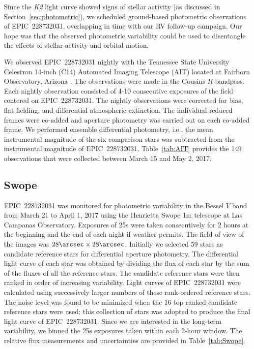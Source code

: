 \documentclass[twocolumn]{aastex61}
\begin{document}
Since the {\it K2} light curve showed signs of stellar activity (as discussed in Section~\ref{sec:photometric}), we scheduled ground-based photometric observations of EPIC~228732031, overlapping in time with our RV follow-up campaign. Our hope was that the observed photometric variability could be used to disentangle the effects of stellar activity and orbital motion.

We observed EPIC~228732031 nightly with the Tennessee State University Celestron 14-inch (C14) Automated Imaging Telescope (AIT) located at Fairborn Observatory, Arizona \citep[see, e.g.,][]{h1999}. The observations were made in the Cousins $R$ bandpass.  Each nightly observation consisted of 4-10 consecutive exposures of the field centered on EPIC~228732031. The nightly observations were corrected for bias, flat-fielding, and differential atmospheric extinction. The individual reduced frames were co-added and aperture photometry was carried out on each co-added frame. We performed ensemble differential photometry, i.e., the mean instrumental magnitude of the six comparison stars was subtracted from the instrumental magnitude of EPIC~228732031. Table~\ref{tab:AIT} provides the 149 observations that were collected between March 15 and May 2, 2017.

\subsection{Swope}

EPIC~228732031 was monitored for photometric variability in the Bessel $V$
band from March 21 to April 1, 2017
using the Henrietta Swope 1m telescope at Las Campanas
Observatory.
Exposures of 25s were taken consecutively for 2 hours
at the beginning and the end of each night if weather permits.
The field of view of the images was $28\arcsec \times 28\arcsec$.
Initially we selected 59 stars as candidate
reference stars for differential aperture photometry.
The differential light curve of each star was obtained
by dividing the flux of each star by the sum of the fluxes
of all the reference stars.
The candidate reference stars were then ranked in order of increasing
variability.  Light curves of EPIC~228732031 were calculated
using successively larger numbers of these rank-ordered
reference stars.  The noise level was found to be minimized
when the 16 top-ranked candidate reference stars were used; this collection
of stars was adopted to produce the final light curve of EPIC~228732031.
Since we are interested in the long-term variability, we binned the 25s exposures taken within each 2-hour window. The relative flux measurements
and uncertainties are provided in Table~\ref{tab:Swope}.
\newline
\newline
\end{document}
